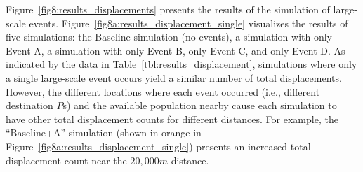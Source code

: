 


Figure~\ref{fig8:results_displacements} presents the results of the simulation of large-scale events.
Figure~\ref{fig8a:results_displacement_single} visualizes the results of five simulations: the Baseline simulation (no events), a simulation with only Event A, a simulation with only Event B, only Event C, and only Event D. 
As indicated by the data in Table~\ref{tbl:results_displacement}, simulations where only a single large-scale event occurs yield a similar number of total displacements. However, the different locations where each event occurred (i.e., different destination $P$s) and the available population nearby cause each simulation to have other total displacement counts for different distances. For example, the ``Baseline+A'' simulation (shown in orange in Figure~\ref{fig8a:results_displacement_single}) presents an increased total displacement count near the $20,000m$ distance.

